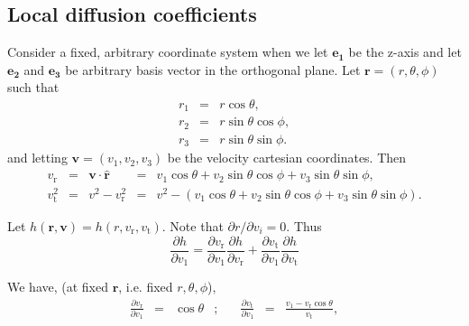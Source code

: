 \documentclass[11pt]{article}
\newcommand{\rt}{\mathrm{t}}
\newcommand{\rr}{\mathrm{r}}
\newcommand{\vr}{v_{\rr}}
\newcommand{\vt}{v_{\rt}}
\newcommand{\bv}{\boldsymbol{v}}
\newcommand{\br}{\boldsymbol{r}}
\newcommand{\hr}{\hat{\br}}
\newcommand{\e}[1]{\boldsymbol{e_{#1}}}
\begin{document}
\begin{appendices}

\section{Local diffusion coefficients}
\label{app:LocDiffCoeffs_Computation}
Consider a fixed, arbitrary coordinate system when we let $\e1$ be the z-axis and let $\e2$ and $\e3$ be arbitrary basis vector in the orthogonal plane. Let $\br = (r,\theta,\phi)$ such that
\begin{equation}
\begin{array}{ccl}
 r_{1} & =& \displaystyle{r\cos\theta} ,\\
  
 r_{2} & =&\displaystyle{r\sin\theta\cos\phi} ,\\

 r_{3} &=& \displaystyle{r\sin\theta\sin\phi} .
\end{array}
\label{eq:r_coord}
\end{equation}
and letting $\bv=(v_{1},v_{2},v_{3})$ be the velocity cartesian coordinates. Then
\begin{equation}
\begin{array}{cclcl}
 \vr &=& \bv \cdot\hr &=& \displaystyle{v_{1}\cos\theta+v_{2}\sin\theta\cos\phi+v_{3}\sin\theta\sin\phi} ,\\

 \vt^{2} &=& v^{2}-\vr^{2} &=& \displaystyle{v^{2}-(v_{1}\cos\theta+v_{2}\sin\theta\cos\phi+v_{3}\sin\theta\sin\phi)} .
\end{array}
\label{eq:vRadTan_coord}
\end{equation}

Let $h(\br,\bv)=h(r,\vr,\vt)$. Note that
${\partial r}/{\partial v_{i}}=0$. Thus
\begin{equation}
\frac{\partial h}{\partial v_{1}}=\frac{\partial \vr}{\partial v_{1}}\frac{\partial h}{\partial \vr}+\frac{\partial \vt}{\partial v_{1}}\frac{\partial h}{\partial \vt}
\label{eq:partial1_h}
\end{equation}

We have, (at fixed $\br$, i.e. fixed  $r,\theta,\phi$),
\begin{equation}
\begin{array}{cclcccl}
 \displaystyle{\frac{\partial\vr}{\partial v_{1}}}&=& \displaystyle{\cos\theta} &;\quad& \displaystyle{\frac{\partial \vt}{\partial v_{1}}} &=& \displaystyle{\frac{v_{1}-\vr\cos\theta}{\vt}},\\



\end{array}
\end{equation}
\end{appendices}
\end{document}
